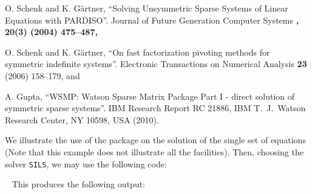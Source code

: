 \documentclass{galahad}
\begin{document}
\noindent
O. Schenk and K. G\"{a}rtner,
``Solving Unsymmetric Sparse Systems of Linear Equations with PARDISO''.
Journal of Future Generation Computer Systems \bf, 20(3) \rm (2004) 475--487, 

\noindent
O. Schenk and K. G\"{a}rtner,
``On fast factorization pivoting methods for symmetric indefinite systems''.
Electronic Transactions on Numerical Analysis
{\bf 23} (2006) 158--179,
and

\noindent
A. Gupta,
``WSMP: Watson Sparse Matrix Package Part I - direct
solution of symmetric sparse systems''.
IBM Research Report RC 21886, IBM T.\ J.\ Watson Research Center,
NY 10598, USA (2010).



\galexample
We illustrate the use of the package on the solution of the
single set of equations
(Note that this example does not illustrate all the facilities).
Then, choosing the solver {\tt SILS}, we may use the following code:

{\tt \small
\VerbatimInput{\packageexample}
}
\noindent
This produces the following output:
{\tt \small
\VerbatimInput{\packageresults}
}
\noindent
\end{document}
